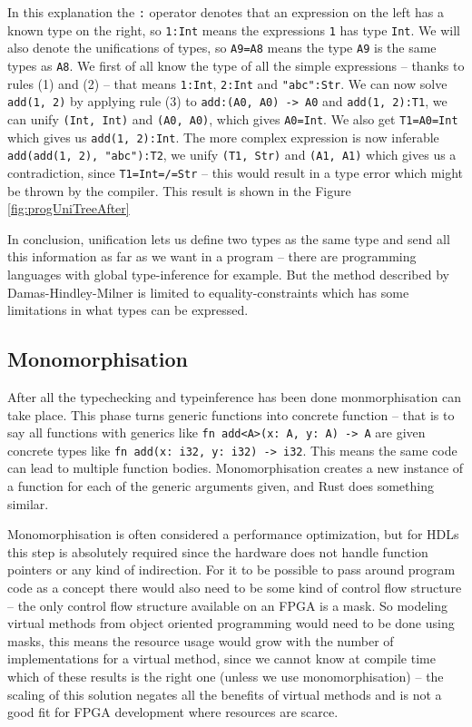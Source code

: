 In this explanation the \verb+:+ operator denotes that an expression on the left has a known type on the right, so \verb+1:Int+ means the expressions \verb+1+ has type \verb+Int+. We will also denote the unifications of types, so \verb+A9=A8+ means the type \verb+A9+ is the same types as \verb+A8+. We first of all know the type of all the simple expressions -- thanks to rules (1) and (2) -- that means \verb+1:Int+, \verb+2:Int+ and \verb+"abc":Str+. We can now solve \verb+add(1, 2)+ by applying rule (3) to \verb+add:(A0, A0) -> A0+ and \verb+add(1, 2):T1+, we can unify \verb+(Int, Int)+ and \verb+(A0, A0)+, which gives \verb+A0=Int+. We also get \verb+T1=A0=Int+ which gives us \verb+add(1, 2):Int+. The more complex expression is now inferable \verb+add(add(1, 2), "abc"):T2+, we unify \verb+(T1, Str)+ and \verb+(A1, A1)+ which gives us a contradiction, since \verb+T1=Int=/=Str+ -- this would result in a type error which might be thrown by the compiler. This result is shown in the Figure \ref{fig:progUniTreeAfter}

In conclusion, unification lets us define two types as the same type and send all this information as far as we want in a program -- there are programming languages with global type-inference for example. But the method described by Damas-Hindley-Milner is limited to equality-constraints which has some limitations in what types can be expressed.

\subsection{Monomorphisation}
After all the typechecking and typeinference has been done monmorphisation can take place. This phase turns generic functions into concrete function -- that is to say all functions with generics like \verb+fn add<A>(x: A, y: A) -> A+ are given concrete types like \verb+fn add(x: i32, y: i32) -> i32+. This means the same code can lead to multiple function bodies. Monomorphisation creates a new instance of a function for each of the generic arguments given, and Rust does something similar. \cite{src:rustMono}

Monomorphisation is often considered a performance optimization, but for HDLs this step is absolutely required since the hardware does not handle function pointers or any kind of indirection. For it to be possible to pass around program code as a concept there would also need to be some kind of control flow structure -- the only control flow structure available on an FPGA is a mask. So modeling virtual methods from object oriented programming would need to be done using masks, this means the resource usage would grow with the number of implementations for a virtual method, since we cannot know at compile time which of these results is the right one (unless we use monomorphisation) -- the scaling of this solution negates all the benefits of virtual methods and is not a good fit for FPGA development where resources are scarce. 

